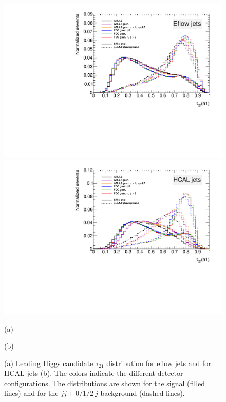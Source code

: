 \begin{figure}[h]
	\centering
	\begin{minipage}{.5\textwidth}
		\centering
		\includegraphics[trim={.65cm 0 0 0},clip,width=\linewidth]{./Figures/tau21_jj.pdf}
	\end{minipage}%
	\begin{minipage}{.5\textwidth}
		\centering
		\includegraphics[trim={0 0 .65cm 0},clip,width=\linewidth]{./Figures/tau21CALO_jj.pdf}
	\end{minipage}
	\begin{minipage}[t]{0.5\textwidth}
		\caption*{(a)}
	\end{minipage}%
	\hfill
	\begin{minipage}[t]{0.5\textwidth}
		\caption*{(b)}
	\end{minipage}
	\caption{(a) Leading Higgs candidate $\tau_{21}$ distribution for eflow jets and for HCAL jets (b). The colors indicate the different detector configurations. The distributions are shown for the signal (filled lines) and for the $jj+0/1/2~j$ background (dashed lines).}
	\label{fig:tau_sep_jj}
\end{figure} 
	



